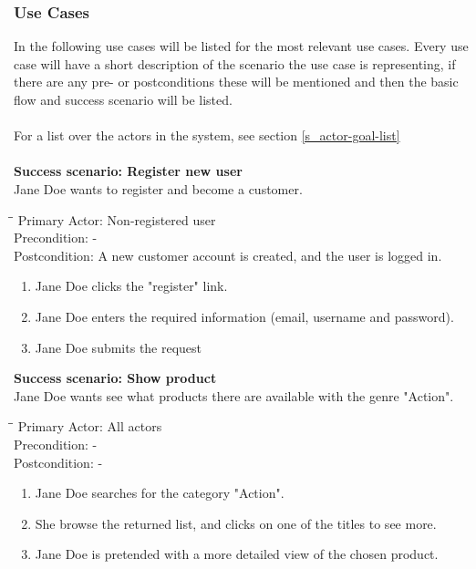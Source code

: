 \subsubsection{Use Cases}
In the following use cases will be listed for the most relevant use cases. Every use case will have a short description of the scenario the use case is representing, if there are any pre- or postconditions these will be mentioned and then the basic flow and success scenario will be listed.
\\
\\
For a list over the actors in the system, see section \ref{s_actor-goal-list}
\\
\\
\textbf{Success scenario: Register new user} \\
Jane Doe wants to register and become a customer. 
\begin{tabbing}
\hspace{5mm}\=\hspace{28mm}\=\kill
\>Primary Actor:\> Non-registered user\\
\>Precondition:\> -\\
\>Postcondition:\> A new customer account is created, and the user is logged in.
\end{tabbing}
\begin{enumerate} \setlength{\itemsep}{-1mm}
	\item Jane Doe clicks the "register" link.
	\item Jane Doe enters the required information (email, username and password).
	\item Jane Doe submits the request
\end{enumerate}
\vspace{3mm}
\textbf{Success scenario: Show product} \\
Jane Doe wants see what products there are available with the genre "Action".
\begin{tabbing}
\hspace{5mm}\=\hspace{26mm}\=\kill
\>Primary Actor:\> All actors\\
\>Precondition:\> -\\
\>Postcondition:\> -
\end{tabbing}
\begin{enumerate} \setlength{\itemsep}{-1mm}
	\item Jane Doe searches for the category "Action".
	\item She browse the returned list, and clicks on one of the titles to see more.
	\item Jane Doe is pretended with a more detailed view of the chosen product.
\end{enumerate}
